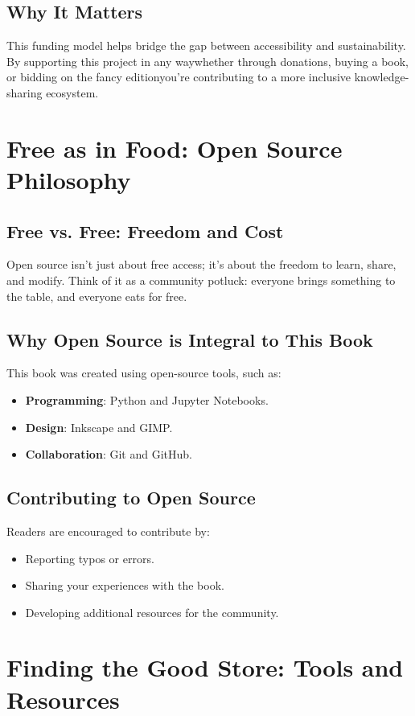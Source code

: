 \subsection{Why It Matters}
This funding model helps bridge the gap between accessibility and sustainability. By supporting this project in any way\textemdash whether through donations, buying a book, or bidding on the fancy edition\textemdash you\textquoteright re contributing to a more inclusive knowledge-sharing ecosystem.

\section{Free as in Food: Open Source Philosophy}
\subsection{Free vs. Free: Freedom and Cost}
Open source isn\textquoteright t just about free access; it\textquoteright s about the freedom to learn, share, and modify. Think of it as a community potluck: everyone brings something to the table, and everyone eats for free.

\subsection{Why Open Source is Integral to This Book}
This book was created using open-source tools, such as:
\begin{itemize}
\item \textbf{Programming}: Python and Jupyter Notebooks.
\item \textbf{Design}: Inkscape and GIMP.
\item \textbf{Collaboration}: Git and GitHub.
\end{itemize}

\subsection{Contributing to Open Source}
Readers are encouraged to contribute by:
\begin{itemize}
\item Reporting typos or errors.
\item Sharing your experiences with the book.
\item Developing additional resources for the community.
\end{itemize}

\section{Finding the Good Store: Tools and Resources}
